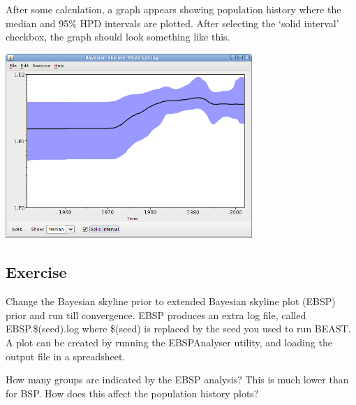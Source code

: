 \documentclass[12pt]{article}
\begin{document}
After some calculation, a graph appears showing population history where the median
and 95\% HPD intervals are plotted. After selecting the `solid interval' checkbox, the
graph should look something like this.

\begin{center}
\includegraphics[width=0.7\textwidth]{figures/tracerBSP3.png}
\end{center}


\subsection{Exercise}
Change the Bayesian skyline prior to extended Bayesian skyline plot (EBSP) prior and run
till convergence. EBSP produces an extra log file, called EBSP.\$(seed).log where \$(seed)
is replaced by the seed you used to run BEAST.
A plot can be created by running the EBSPAnalyser utility, and loading the output file
in a spreadsheet.

How many groups are indicated by the EBSP analysis?
This is much lower than for BSP. How does this affect the population history plots?

 
%

\end{document}

